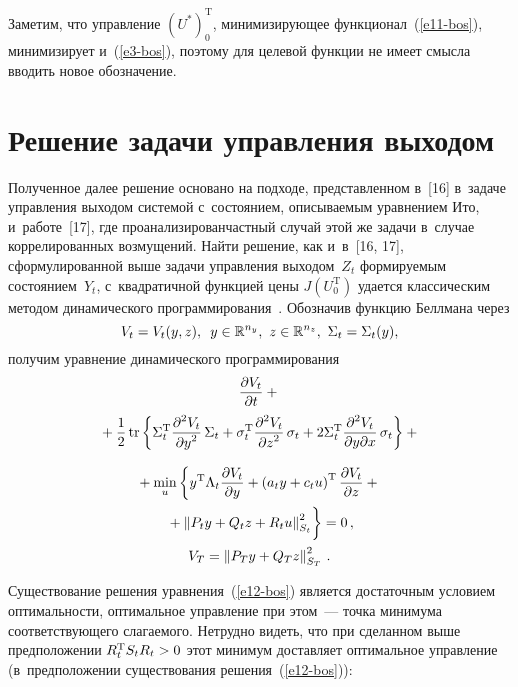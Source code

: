 \begin{multicols}{2}
{}

     
     \smallskip
     
     Заметим, что управление $(U^*)_0^{\mathrm{T}}$, ми\-ни\-ми\-зи\-ру\-ющее 
функционал~(\ref{e11-bos}), минимизирует и~(\ref{e3-bos}), поэтому для 
целевой функции не имеет смысла вводить новое обозначение.
     
\section{Решение задачи управления выходом}

     Полученное далее решение основано на подходе, представленном 
в~[16] в~задаче управления вы\-ходом системой с~состоянием, описываемым 
урав\-нением Ито, и~работе~[17], где проанализирован\linebreak частный случай этой же 
задачи в~случае коррелированных возмущений. Найти решение, как и~в~[16, 
17], сформулированной выше задачи управления выходом~$Z_t$ 
формируемым состоянием~$Y_t$, с~квад\-ра\-тич\-ной функцией цены 
$J(U_0^{\mathrm{T}})$ удается классическим методом динамического  
программирования~\cite{4-bos, 5-bos}. Обозначив функцию Беллмана через 
$$
V_t\hm= V_t(y,z),\enskip y\hm\in \mathbb{R}^{n_y},\ z\hm\in 
\mathbb{R}^{n_z},\ \Sigma_t\hm= \Sigma_t(y),
$$
 получим уравнение 
динамического программирования
     \begin{multline*}
     \displaystyle\frac{\displaystyle \partial V_t\mathstrut}{\displaystyle \partial t\mathstrut} +{}\\
     {}+\displaystyle\frac{\displaystyle 1\mathstrut}{\displaystyle 2\mathstrut}\,\mathrm{tr}\left\{ \Sigma_t^{\mathrm{T}} 
\displaystyle\frac{\displaystyle \partial^2 V_t\mathstrut}{\displaystyle \partial y^2\mathstrut}\,\Sigma_t +\sigma_t^{\mathrm{T}} \displaystyle\frac{\displaystyle \partial^2V_t\mathstrut}{\displaystyle \partial 
z^2\mathstrut}\,\sigma_t +2\Sigma_t^{\mathrm{T}}\displaystyle\frac{\displaystyle \partial^2 V_t\mathstrut}{\displaystyle \partial 
y\partial x\mathstrut}\,\sigma_t\right\}+{}
     \end{multline*}

\noindent
\begin{multline}
     {}+\min\limits_u \left\{ y^{\mathrm{T}} \Lambda_t \fr{\partial V_t}{\partial y} +\left( 
a_t y +c_t u\right)^{\mathrm{T}}\fr{\partial V_t}{\partial z} +{}\right.\\[1pt]
\left.{}+\left\| P_t y+Q_tz +R_t 
u\right\|^2_{S_t}\!
\vphantom{\fr{\partial V_t}{\partial y}}
\right\}=0\,,\\[1pt] 
     V_T=\left\| P_T y +Q_T z\right\|^2_{S_T}\,.
          \label{e12-bos}
\end{multline}
     
     Существование решения уравнения~(\ref{e12-bos}) является 
достаточным условием оптимальности, оптимальное управление при 
этом~--- точка минимума соответствующего слагаемого. Нетрудно видеть,\linebreak 
что при сделанном выше предположении $R_t^{\mathrm{T}} S_t R_t\hm>0$ этот 
минимум доставляет оптимальное управ\-ле\-ние (в~предположении 
существования решения~(\ref{e12-bos})):


\end{multicols}
